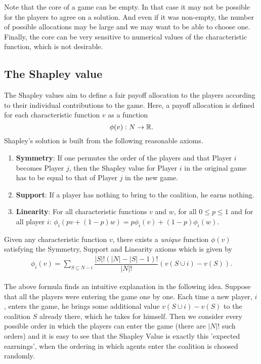 Note that the core of a game can be empty. In that case it may not be possible for the players to agree on a solution. And even if it was non-empty, the number of possible allocations may be large and we may want to be able to choose one. Finally, the core can be very sensitive to numerical values of the characteristic function, which is not desirable. 


\subsection{The Shapley value}



The Shapley values aim to define a fair payoff allocation to the players according to their individual contributions to the game. Here, a payoff allocation is defined for each characteristic function $v$ as a function $$\phi(v) : N \rightarrow \mathbb{R}.$$ 
Shapley's solution is built from the following reasonable axioms. 

\begin{enumerate}
	\item \textbf{Symmetry}: If one permutes the order of the players and that Player $i$ becomes Player $j$, then the Shapley value for Player $i$ in the original game has to be equal to that of Player $j$ in the new game.
	\item \textbf{Support}: If a player has nothing to bring to the coalition, he earns nothing.
	\item \textbf{Linearity}: For all characteristic functions $v$ and $w$, for all $0 \leq p \leq 1$ and for all player $i$: $\phi_i(pv + (1-p)w) = p\phi_i(v) + (1-p)\phi_i(w)$.
\end{enumerate}

\begin{theorem}
Given any characteristic function $v$, there exists a \emph{unique} function $\phi(v)$ satisfying the Symmetry, Support and Linearity axioms which is given by
\begin{align*}
	\phi_i(v) = \sum_{S \subseteq N -i}{\dfrac{|S|!(|N| - |S| - 1)!}{|N|!} (v(S \cup {i}) - v(S))}.
\end{align*}
\end{theorem}


The above formula finds an intuitive explanation in the following idea. Suppose that all the players were entering the game one by one. Each time a new player, $i$, enters the game, he brings some additional value $v(S \cup {i}) - v(S)$ to the coalition $S$ already there, which he takes for himself. Then we consider every possible order in which the players can enter the game (there are $|N|!$ such orders) and it is easy to see that the Shapley Value is exactly this 'expected eazrnings', when the ordering in which agents enter the coalition is choosed randomly.



\ifx \globalmark \undefined %


	
\else 
	
\fi